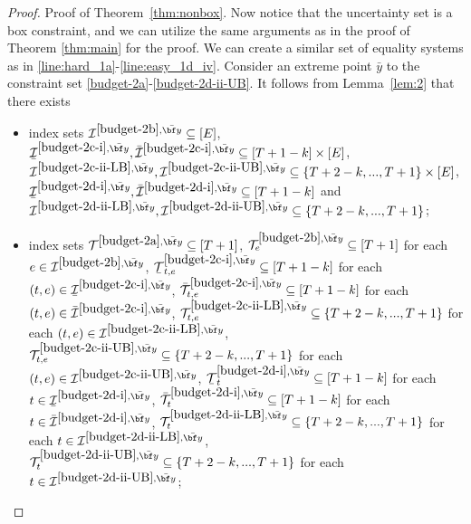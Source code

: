 \documentclass[nonblindrev,mnsc]{informs3} %
\newcommand{\by}{{\bf y}}
\newcommand{\ubar}[1]{\text{\b{$#1$}}}
\begin{document}
\begin{APPENDICES}
\begin{proof}{Proof of Theorem~\ref{thm:nonbox}.}
Now notice that the uncertainty set is a box constraint, and we can utilize the same arguments as in the proof of Theorem \ref{thm:main} for the proof. We can create a similar set of equality systems as in \eqref{line:hard_1a}-\eqref{line:easy_1d_iv}. Consider an extreme point $\bar y$ to the constraint set \eqref{budget-2a}-\eqref{budget-2d-ii-UB}. It follows from Lemma~\ref{lem:2} that there exists 
\begin{itemize}
\item
index sets $\mathcal{I}^{\ref{budget-2b},\bar{\by}} \subseteq [E]$,   $\ubar{\mathcal{I}}^{\ref{budget-2c-i},\bar{\by}},\bar{\mathcal{I}}^{\ref{budget-2c-i},\bar{\by}} \subseteq [T+1-k]\times[E]$, ${\mathcal{I}}^{\ref{budget-2c-ii-LB},\bar{\by}},{\mathcal{I}}^{\ref{budget-2c-ii-UB},\bar{\by}} \subseteq \{T+2-k,...,T+1\}\times[E]$, $\ubar{\mathcal{I}}^{\ref{budget-2d-i},\bar{\by}},\bar{\mathcal{I}}^{\ref{budget-2d-i},\bar{\by}}  \subseteq [T+1-k]$ and  ${\mathcal{I}}^{\ref{budget-2d-ii-LB},\bar{\by}},{\mathcal{I}}^{\ref{budget-2d-ii-UB},\bar{\by}}  \subseteq \{T+2-k,...,T+1\}$; 

\item index sets $\mathcal{T}^{\ref{budget-2a},\bar{\by}} \subseteq [T+1]$, $\mathcal{T}^{\ref{budget-2b},\bar{\by}}_e \subseteq [T+1]$ for each $e \in \mathcal{I}^{\ref{budget-2b},\bar{\by}}$,  
$\ubar{\mathcal{T}}^{\ref{budget-2c-i},\bar{\by}}_{t,e} \subseteq [T+1-k]$ for each $(t,e) \in \ubar{\mathcal{I}}^{\ref{budget-2c-i},\bar{\by}}$, 
$\bar{\mathcal{T}}^{\ref{budget-2c-i},\bar{\by}}_{t,e} \subseteq [T+1-k]$  for each $(t,e) \in \bar{\mathcal{I}}^{\ref{budget-2c-i},\bar{\by}}$, 
${\mathcal{T}}^{\ref{budget-2c-ii-LB},\bar{\by}}_{t,e} \subseteq \{T+2-k,...,T+1\}$ for each $(t,e) \in {\mathcal{I}}^{\ref{budget-2c-ii-LB},\bar{\by}}$, 
${\mathcal{T}}^{\ref{budget-2c-ii-UB},\bar{\by}}_{t,e} \subseteq \{T+2-k,...,T+1\}$  for each $(t,e) \in {\mathcal{I}}^{\ref{budget-2c-ii-UB},\bar{\by}}$,
$\ubar{\mathcal{T}}^{\ref{budget-2d-i},\bar{\by}}_{t} \subseteq [T+1-k]$ for each $t \in \ubar{\mathcal{I}}^{\ref{budget-2d-i},\bar{\by}}$,   $\bar{\mathcal{T}}^{\ref{budget-2d-i},\bar{\by}}_{t} \subseteq [T+1-k]$ for each $t \in \bar{\mathcal{I}}^{\ref{budget-2d-i},\bar{\by}}$, ${\mathcal{T}}^{\ref{budget-2d-ii-LB},\bar{\by}}_{t} \subseteq \{T+2-k,...,T+1\}$ for each $t \in {\mathcal{I}}^{\ref{budget-2d-ii-LB},\bar{\by}}$,   ${\mathcal{T}}^{\ref{budget-2d-ii-UB},\bar{\by}}_{t} \subseteq \{T+2-k,...,T+1\}$ for each $t \in {\mathcal{I}}^{\ref{budget-2d-ii-UB},\bar{\by}}$;


\end{itemize}
\end{proof}
\end{APPENDICES}
\end{document}
